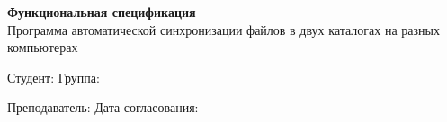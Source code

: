 \documentclass[12pt,a4paper]{article}
\begin{document}
\begin{center}
{\Large\bfseries Функциональная спецификация}\\[4mm]
{\large Программа автоматической синхронизации файлов в двух каталогах на разных компьютерах}
\end{center}
\vspace{3mm}
Студент: \underline{\hspace{65mm}}\hfill Группа: \underline{\hspace{25mm}}

Преподаватель: \underline{\hspace{53mm}}\hfill Дата согласования: \underline{\hspace{20mm}}


\end{document}
